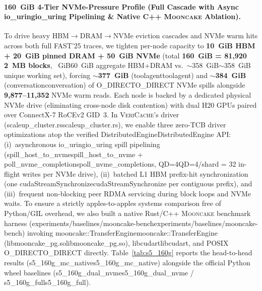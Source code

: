 \documentclass[11pt,a4paper]{article}
\let\origunderscore\_
\DeclareRobustCommand{\code}[1]{{\ttfamily\ifmmode #1\else\def\_{\origunderscore\hspace{0pt}}#1\fi}}
\newcommand{\VC}{\textsc{VeriCache}}
\newcommand{\MC}{\textsc{Mooncake}}
\begin{document}
\paragraph{160~GiB 4-Tier NVMe-Pressure Profile (Full Cascade with Async \code{io\_uring} Pipelining \& Native C++ \MC{} Ablation).}
To drive heavy HBM$\to$DRAM$\to$NVMe eviction cascades and NVMe warm hits across both full FAST'25 traces, we tighten per-node capacity to \textbf{10~GiB HBM + 20~GiB pinned DRAM + 50~GiB NVMe} (total \textbf{160~GiB = 81,920 2~MB blocks}, \code{60~GiB} aggregate HBM+DRAM vs.\ \code{$\sim$358~GiB} unique working set), forcing \textbf{$\sim$377~GiB} (\code{toolagent}) and \textbf{$\sim$384~GiB} (\code{conversation}) of \code{O\_DIRECT} NVMe spills alongside \textbf{9,877--11,352} NVMe warm reads. Each node is backed by a dedicated physical NVMe drive (eliminating cross-node disk contention) with dual H20 GPUs paired over ConnectX-7 RoCEv2 GID~3. In \VC{}'s driver (\code{scaleup\_cluster.rs}), we enable three zero-TCB driver optimizations atop the verified \code{DistributedEngine} API: (i)~asynchronous \code{io\_uring} spill pipelining (\code{spill\_host\_to\_nvme} + \code{poll\_nvme\_completions}, \code{QD=4}/shard = \code{32} in-flight writes per NVMe drive), (ii)~batched L1 HBM prefix-hit synchronization (one \code{cudaStreamSynchronize} per contiguous prefix), and (iii)~frequent non-blocking peer RDMA servicing during block loops and NVMe waits. To ensure a strictly apples-to-apples systems comparison free of Python/GIL overhead, we also built a native Rust/C++ \MC{} benchmark harness (\code{experiments/baselines/mooncake-bench}) invoking \code{mooncake::TransferEngine} (\code{libmooncake\_pg.so}), \code{libcudart}, and POSIX \code{O\_DIRECT} directly. Table~\ref{tab:s5_160g} reports the head-to-head results (\code{s5\_160g\_mc\_native}) alongside the official Python wheel baselines (\code{s5\_160g\_dual\_nvme} / \code{s5\_160g\_full}).
\end{document}
